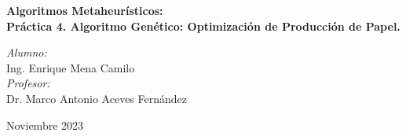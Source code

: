 
\begin{titlepage}

\vspace*{10cm}
{\huge \bfseries \textcolor{RojoUAQ}{Algoritmos Metaheurísticos: \\ Práctica 4. Algoritmo Genético: Optimización de Producción de Papel.}}

\vspace*{1cm}

\begin{center}
	\noindent
	\begin{minipage}{0.4\textwidth}
	\begin{flushleft} \large
	\end{flushleft}
	\end{minipage}	
	\begin{minipage}{0.5\textwidth}
	\begin{flushright} \large
	\emph{Alumno:} \\
	Ing. Enrique Mena Camilo \\[1.5cm]
	\emph{Profesor:} \\
	Dr. Marco Antonio Aceves Fernández
	\end{flushright}
	\end{minipage}
	\vfill
	{\large Noviembre 2023}
\end{center}
\end{titlepage}
